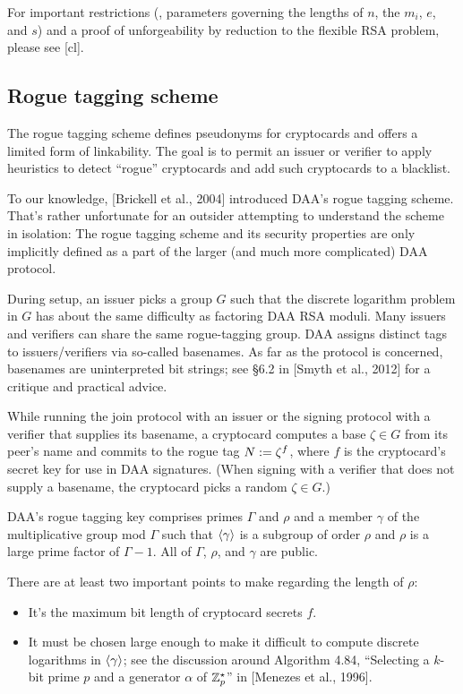 For important restrictions (\ie, parameters
governing the lengths of $n$, the $m_i$, $e$, and
$s$) and a proof of unforgeability by reduction to the flexible RSA problem, please
see [cl].

\subsection{Rogue tagging scheme}

The rogue tagging scheme defines pseudonyms for cryptocards and offers
a limited form of linkability.
The goal is to permit an issuer or verifier to apply heuristics to detect ``rogue'' cryptocards
and add such cryptocards to a blacklist.

To our knowledge, [Brickell et al., 2004] introduced DAA's rogue tagging scheme.
That's rather unfortunate for an outsider attempting to understand the scheme in isolation:
The rogue tagging scheme and its security properties are only implicitly defined as a part of the larger (and much more complicated) DAA protocol.

During setup, an issuer picks a group $G$ such that the discrete
logarithm problem in $G$ has about the same difficulty as
factoring DAA RSA moduli.
Many issuers and verifiers can share the same rogue-tagging
group. DAA assigns distinct tags to issuers/verifiers via
so-called basenames. As far as the protocol is concerned,
basenames are uninterpreted bit strings; see \S\/6.2 in [Smyth et
al., 2012] for a critique and practical advice.

While running the join protocol with an issuer or the signing
protocol with a verifier that supplies its basename, a
cryptocard computes a base $\zeta \in G$ from its peer's name and
commits to the rogue tag $N \mathrel{:=} \zeta^f$, where $f$ is the cryptocard's
secret key for use in DAA signatures. (When signing with a
verifier that does not supply a basename, the cryptocard picks
a random $\zeta \in G$.)

\medskip

DAA's rogue tagging key comprises primes $\Gamma$ and $\rho$ and a member $\gamma$
of the multiplicative group mod $\Gamma$ such that $\langle{\gamma}\rangle$ is a subgroup of order $\rho$ and $\rho$ is a
large prime factor of $\Gamma - 1$.
All of $\Gamma$, $\rho$, and $\gamma$ are public.

There are at least two important points to make regarding the length of $\rho$:
\begin{itemize}

\item It's the maximum bit length of cryptocard secrets $f$.

\item It must be chosen large enough to make it difficult to
compute discrete logarithms in $\langle{\gamma}\rangle$; see the discussion around
Algorithm 4.84, ``Selecting a $k$-bit prime $p$ and a generator $\alpha$
of $\mathbb{Z}^{\star}_{p}$'' in [Menezes et al., 1996].

\end{itemize}

